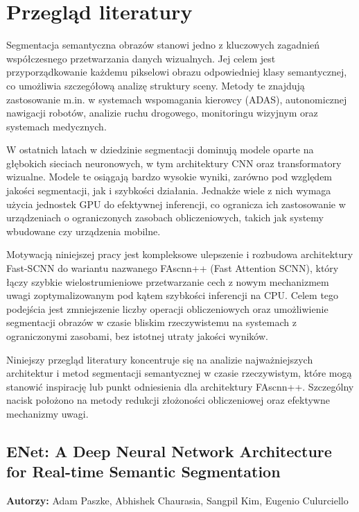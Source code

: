 \chapter{Przegląd literatury}

Segmentacja semantyczna obrazów stanowi jedno z kluczowych zagadnień współczesnego przetwarzania danych wizualnych. Jej celem jest przyporządkowanie każdemu pikselowi obrazu odpowiedniej klasy semantycznej, co umożliwia szczegółową analizę struktury sceny. Metody te znajdują zastosowanie m.in. w systemach wspomagania kierowcy (ADAS), autonomicznej nawigacji robotów, analizie ruchu drogowego, monitoringu wizyjnym oraz systemach medycznych.

W ostatnich latach w dziedzinie segmentacji dominują modele oparte na głębokich sieciach neuronowych, w tym architektury CNN oraz transformatory wizualne. Modele te osiągają bardzo wysokie wyniki, zarówno pod względem jakości segmentacji, jak i szybkości działania. Jednakże wiele z nich wymaga użycia jednostek GPU do efektywnej inferencji, co ogranicza ich zastosowanie w urządzeniach o ograniczonych zasobach obliczeniowych, takich jak systemy wbudowane czy urządzenia mobilne.

Motywacją niniejszej pracy jest kompleksowe ulepszenie i rozbudowa architektury Fast-SCNN do wariantu nazwanego FAscnn++ (Fast Attention SCNN), który łączy szybkie wielostrumieniowe przetwarzanie cech z nowym mechanizmem uwagi zoptymalizowanym pod kątem szybkości inferencji na CPU. Celem tego podejścia jest zmniejszenie liczby operacji obliczeniowych oraz umożliwienie segmentacji obrazów w czasie bliskim rzeczywistemu na systemach z ograniczonymi zasobami, bez istotnej utraty jakości wyników.

Niniejszy przegląd literatury koncentruje się na analizie najważniejszych architektur i metod segmentacji semantycznej w czasie rzeczywistym, które mogą stanowić inspirację lub punkt odniesienia dla architektury FAscnn++. Szczególny nacisk położono na metody redukcji złożoności obliczeniowej oraz efektywne mechanizmy uwagi.



\section{ENet: A Deep Neural Network Architecture for Real-time Semantic Segmentation}
\textbf{Autorzy:} Adam Paszke, Abhishek Chaurasia, Sangpil Kim, Eugenio Culurciello


